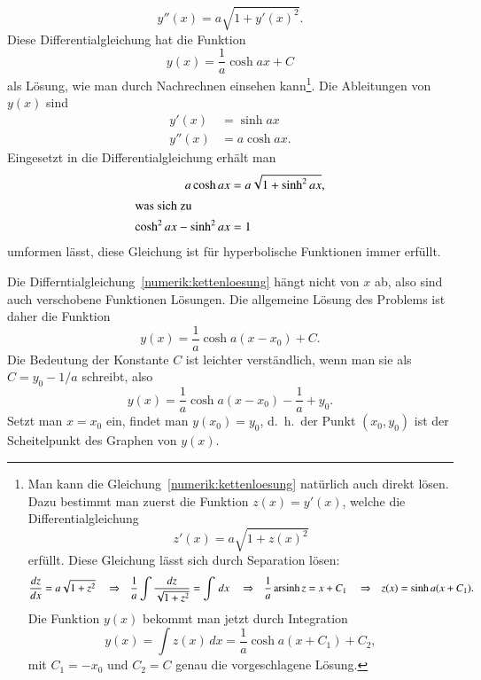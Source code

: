 \begin{loesung}
\begin{equation}
y''(x)=a\sqrt{1+y'(x)^2}.
\label{numerik:kettenloesung}
\end{equation}
Diese Differentialgleichung hat die Funktion
\[
y(x) = \frac1a \cosh ax + C
\]
als Lösung, wie man durch Nachrechnen einsehen kann\footnote{
Man kann die Gleichung~\eqref{numerik:kettenloesung} natürlich auch direkt
lösen. Dazu bestimmt man zuerst die Funktion $z(x)=y'(x)$, welche die
Differentialgleichung
\[
z'(x)=a\sqrt{1+z(x)^2}
\]
erfüllt.
Diese Gleichung lässt sich durch Separation lösen:
\[
\begin{aligned}
\frac{dz}{dx}&=a\sqrt{1+z^2}
&&\Rightarrow&
\frac1a \int\frac{dz}{\sqrt{1+z^2}}&=\int \,dx
&&\Rightarrow&
\frac1a \operatorname{arsinh} z &=x+C_1
&&\Rightarrow&
z(x)=\sinh a(x+C_1).
\end{aligned}
\]
Die Funktion $y(x)$ bekommt man jetzt durch Integration
\[
y(x)=\int z(x)\,dx = \frac1a \cosh a(x+C_1) + C_2,
\]
mit $C_1 = -x_0$ und $C_2=C$ genau die vorgeschlagene Lösung.
}.
Die Ableitungen von $y(x)$ sind
\begin{align*}
y' (x) &=  \sinh ax\\
y''(x) &= a\cosh ax.
\end{align*}
Eingesetzt in die Differentialgleichung erhält man
\begin{align*}
a\cosh ax&=a\sqrt{1+\sinh^2 ax},
\\
\intertext{was sich zu}
\cosh^2ax-\sinh^2ax&=1
\end{align*}
umformen lässt, diese Gleichung ist für hyperbolische Funktionen
immer erfüllt.

Die Differntialgleichung~\eqref{numerik:kettenloesung}
hängt nicht von $x$ ab,
also sind auch verschobene Funktionen Lösungen.
Die allgemeine Lösung des Problems ist daher die Funktion
\begin{equation}
y(x)=\frac1a\cosh a(x-x_0) + C.
\label{numerik:ketteaC}
\end{equation}
Die Bedeutung der Konstante $C$ ist leichter verständlich, wenn man sie
als $C=y_0-1/a$ schreibt, also
\[
y(x)=\frac1a\cosh a(x-x_0) -\frac1a+y_0.
\]
Setzt man $x=x_0$ ein, findet man $y(x_0)=y_0$, d.~h.~der Punkt $(x_0,y_0)$
ist der Scheitelpunkt des Graphen von $y(x)$.


\end{loesung}
